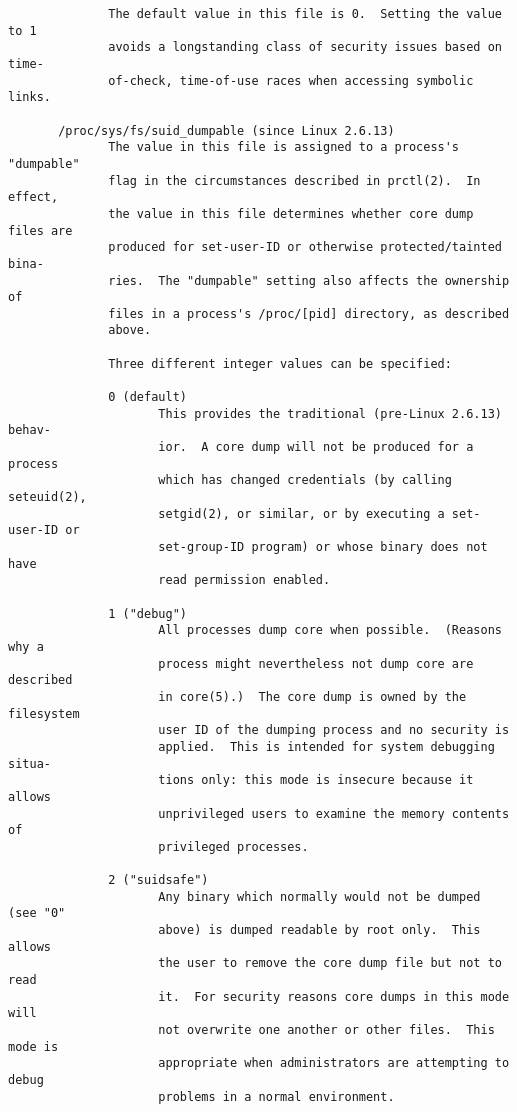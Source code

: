 \documentclass[]{article}
\begin{document}
\begin{verbatim}
              The default value in this file is 0.  Setting the value to 1
              avoids a longstanding class of security issues based on time-
              of-check, time-of-use races when accessing symbolic links.

       /proc/sys/fs/suid_dumpable (since Linux 2.6.13)
              The value in this file is assigned to a process's "dumpable"
              flag in the circumstances described in prctl(2).  In effect,
              the value in this file determines whether core dump files are
              produced for set-user-ID or otherwise protected/tainted bina‐
              ries.  The "dumpable" setting also affects the ownership of
              files in a process's /proc/[pid] directory, as described
              above.

              Three different integer values can be specified:

              0 (default)
                     This provides the traditional (pre-Linux 2.6.13) behav‐
                     ior.  A core dump will not be produced for a process
                     which has changed credentials (by calling seteuid(2),
                     setgid(2), or similar, or by executing a set-user-ID or
                     set-group-ID program) or whose binary does not have
                     read permission enabled.

              1 ("debug")
                     All processes dump core when possible.  (Reasons why a
                     process might nevertheless not dump core are described
                     in core(5).)  The core dump is owned by the filesystem
                     user ID of the dumping process and no security is
                     applied.  This is intended for system debugging situa‐
                     tions only: this mode is insecure because it allows
                     unprivileged users to examine the memory contents of
                     privileged processes.

              2 ("suidsafe")
                     Any binary which normally would not be dumped (see "0"
                     above) is dumped readable by root only.  This allows
                     the user to remove the core dump file but not to read
                     it.  For security reasons core dumps in this mode will
                     not overwrite one another or other files.  This mode is
                     appropriate when administrators are attempting to debug
                     problems in a normal environment.


\end{verbatim}
\end{document}
